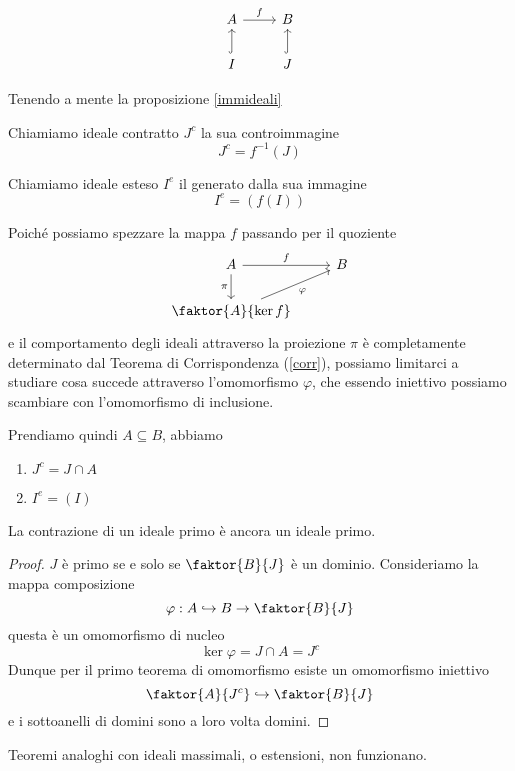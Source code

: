 \begin{multicols}{2}
\[ \begin{tikzcd}
A \arrow{r}{f}  & B \\
I \arrow[swap, hook]{u}{} & J \arrow[swap, hook]{u}{}
\end{tikzcd} \]

Tenendo a mente la proposizione \ref{immideali}

\begin{definition}
	Chiamiamo ideale contratto $ J^c $ la sua controimmagine $$  J^c = f^{-1}(J)  $$
\end{definition}
\begin{definition}
	Chiamiamo ideale esteso $ I^e $ il generato dalla sua immagine
	\[I^e = \left(f(I)\right) \]
\end{definition}

Poiché possiamo spezzare la mappa $ f $ passando per il quoziente
\[ \begin{tikzcd}
A \arrow{r}{f} \arrow[swap]{d}{\pi} & B \\
\faktor{A}{\ker f} \arrow[swap]{ru}{\varphi}
\end{tikzcd} \]
e il comportamento degli ideali attraverso la proiezione $ \pi $ è completamente determinato dal Teorema di Corrispondenza (\ref{corr}), possiamo limitarci a studiare cosa succede attraverso l'omomorfismo $ \varphi $, che essendo iniettivo possiamo scambiare con l'omomorfismo di inclusione.

Prendiamo quindi $ A \subseteq B $, abbiamo
\begin{enumerate}
	\item $ J^c = J \cap A $
	\item $ I^e = (I) $
\end{enumerate}

\begin{prop}\label{contr}
	La contrazione di un ideale primo è ancora un ideale primo.
\end{prop}
\begin{proof}
	$ J $ è primo se e solo se $ \faktor{B}{J} $ è un dominio. Consideriamo la mappa composizione 
	\[ \varphi : A \hookrightarrow B \to \faktor{B}{J} \]
	questa è un omomorfismo di nucleo
	\[ \ker\varphi = J \cap A = J^c \]
	Dunque per il primo teorema di omomorfismo esiste un omomorfismo iniettivo
	\[ \faktor{A}{J^c} \hookrightarrow \faktor{B}{J} \]
	e i sottoanelli di domini sono a loro volta domini.
\end{proof}

Teoremi analoghi con ideali massimali, o estensioni, non funzionano.


\end{multicols}
